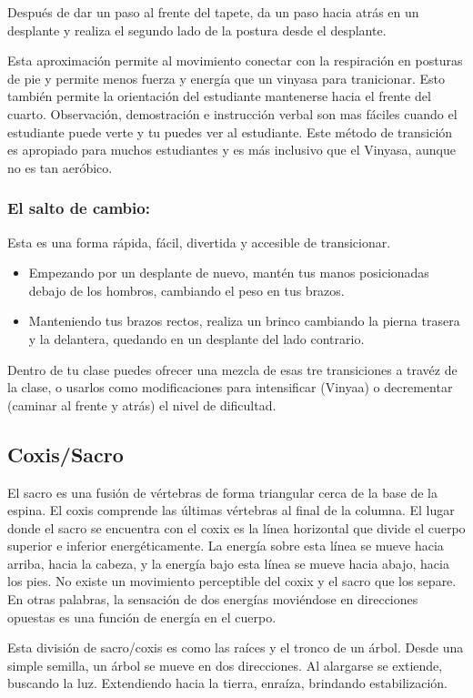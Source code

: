 Después de dar un paso al frente del tapete, da un paso hacia atrás en un desplante y realiza el segundo lado de la postura desde el desplante.

Esta aproximación permite al movimiento conectar con la respiración en posturas de pie y permite menos fuerza y energía que un vinyasa para tranicionar. Esto también permite la orientación del estudiante mantenerse hacia el frente del cuarto. Observación, demostración e instrucción verbal son mas fáciles cuando el estudiante puede verte y tu puedes ver al estudiante. Este método de transición es apropiado para muchos estudiantes y es más inclusivo que el Vinyasa, aunque no es tan aeróbico.

\subsubsection{El salto de cambio:}
Esta es una forma rápida, fácil, divertida y accesible de transicionar.
\begin{itemize}
	\item Empezando por un desplante de nuevo, mantén tus manos posicionadas debajo de los hombros, cambiando el peso en tus brazos.
	\item Manteniendo tus brazos rectos, realiza un brinco cambiando la pierna trasera y la delantera, quedando en un desplante del lado contrario.
\end{itemize}

Dentro de tu clase puedes ofrecer una mezcla de esas tre transiciones a travéz de la clase, o usarlos como modificaciones para intensificar (Vinyaa) o decrementar (caminar al frente y atrás) el nivel de dificultad.

\subsection{Coxis/Sacro}
El sacro es una fusión de vértebras de forma triangular cerca de la base de la espina. El coxis comprende las últimas vértebras al final de la columna. El lugar donde el sacro se encuentra con el coxix es la línea horizontal que divide el cuerpo superior e inferior energéticamente. La energía sobre esta línea se mueve hacia arriba, hacia la cabeza, y la energía bajo esta línea se mueve hacia abajo, hacia los pies. No existe un movimiento perceptible del coxix y el sacro que los separe. En otras palabras, la sensación de dos energías moviéndose en direcciones opuestas es una función de energía en el cuerpo.

Esta división de sacro/coxis es como las raíces y el tronco de un árbol. Desde una simple semilla, un árbol se mueve en dos direcciones. Al alargarse se extiende, buscando la luz. Extendiendo hacia la tierra, enraíza, brindando estabilización.

